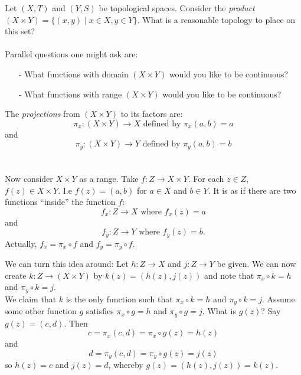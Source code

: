 \documentclass[12pt]{report}
\newcommand{\define}{  \noindent{\sc Definition }\hspace{5pt} }
\begin{document}
Let $(X,T)$ and $(Y,S)$ be topological spaces. Consider the 
{\em product} $(X \times Y) = \{(x,y) \mid x \in X, y \in Y\}$. What is a
reasonable topology to place on this set?\\
\\
Parallel questions one might ask are:
\begin{itemize}
\item[-] What functions with domain $(X \times Y)$ would you like to be
continuous?
\item[-] What functions with range $(X \times Y)$ would you like to be
continuous?
\end{itemize}
\vspace{12pt}
\define The   {\em projections} from $(X \times
Y)$ to its factors are:
\begin{displaymath}
\pi_x: (X \times Y) \rightarrow X \textrm{ defined by } \pi_x(a,b) = a
\end{displaymath}
and
\begin{displaymath}
\pi_y: (X \times Y) \rightarrow Y \textrm{ defined by } \pi_y(a,b) = b
\end{displaymath}\\
\\
Now consider $X \times Y$ as a range. Take $f: Z \rightarrow X \times Y$. For
each $z \in Z$, $f(z) \in X \times Y$. I.e $f(z) = (a,b)$ for $a \in X$ and $b
\in Y$.  It is as if there are two functions ``inside'' the function $f$: 
\begin{displaymath}
f_x:Z \rightarrow X \textrm{ where } f_x(z) = a
\end{displaymath}
and
\begin{displaymath}
f_y: Z \rightarrow Y \textrm{ where } f_y(z) = b. 
\end{displaymath}
Actually,  $f_x = \pi_x \circ f$  and $f_y = \pi_y \circ f$. 

We can turn this idea around: Let $h: Z \rightarrow X$ and
$j: Z \rightarrow Y$ be given. We can now create $k: Z \rightarrow (X \times
Y)$ by $k(z) = (h(z), j(z))$ and note that $\pi_x \circ k = h$ and $\pi_y \circ
k = j$. \\


We claim that $k$ is the only function such that $\pi_x \circ k = h $ and
$\pi_y \circ k = j$. Assume some other function $g$ satisfies $\pi_x \circ g =
h$ and $\pi_y \circ g = j$. What is $g(z)$? Say $g(z) = (c,d)$. Then 
\begin{displaymath}
c = \pi_x(c,d) = \pi_x \circ g(z) = h(z) 
\end{displaymath}
and 
\begin{displaymath}
d = \pi_y(c,d) = \pi_y \circ g(z) = j(z)
\end{displaymath}
so $h(z) = c$ and $j(z) = d$, whereby $g(z) = (h(z), j(z)) = k(z)$. \\
\end{document}
